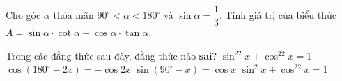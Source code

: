 

\begin{ex}%
	Cho góc  $\alpha$ thỏa mãn $90^{\circ}<\alpha<180^{\circ}$ và $\sin\alpha=\dfrac{1}{3}$. Tính giá trị của biểu thức \break$A=\sin\alpha\cdot\cot\alpha+\cos\alpha\cdot\tan\alpha$.
\end{ex}

\begin{ex}%
	Trong các đẳng  thức sau đây, đẳng thức nào \textbf{sai}?
	 \choice
		{$\sin  ^22x+\cos ^22x=1$}
		{$\cos \left(180^{\circ}-2x\right)=-\cos 2x$} 
		{$\sin  \left(90^{\circ}-x\right)=\cos x$}
		{\True $\sin ^2x+\cos ^22x=1$} 
\end{ex}


